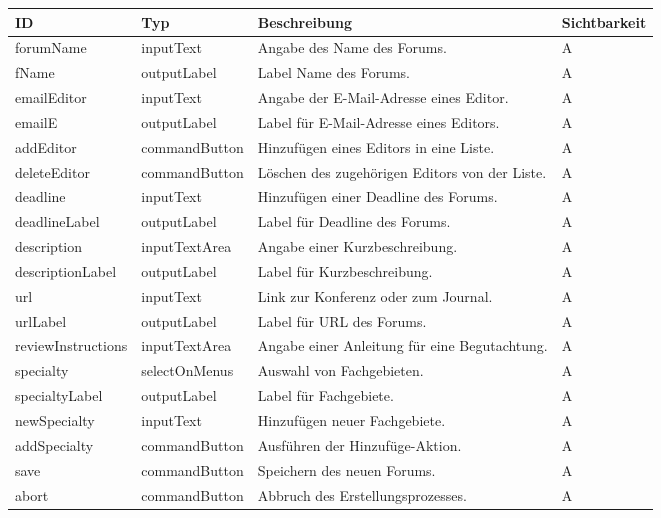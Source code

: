 \begin{tabular}[H]{|m{2cm}|m{3cm}|m{6cm}|m{2.5cm}|}
    \hline
    \textbf{ID} & \textbf{Typ} & \textbf{Beschreibung} & \textbf{Sichtbarkeit} \\
    \hline
    \hline
    forumName & inputText & Angabe des Name des Forums. & A\\
    \hline
    fName & outputLabel & Label Name des Forums. & A\\
    \hline
    emailEditor & inputText & Angabe der E-Mail-Adresse eines Editor. & A\\
    \hline
    emailE & outputLabel & Label für E-Mail-Adresse eines Editors. & A\\
    \hline
    addEditor & commandButton & Hinzufügen eines Editors in eine Liste. & A\\
    \hline
    deleteEditor & commandButton & Löschen des zugehörigen Editors von der Liste. & A\\
    \hline
    deadline & inputText & Hinzufügen einer Deadline des Forums. & A\\
    \hline
    deadlineLabel & outputLabel & Label für Deadline des Forums. & A\\
    \hline
    description & inputTextArea & Angabe einer Kurzbeschreibung. & A\\
    \hline
    descriptionLabel & outputLabel & Label für Kurzbeschreibung. & A\\
    \hline
    url & inputText & Link zur Konferenz oder zum Journal. & A\\
    \hline
    urlLabel & outputLabel & Label für URL des Forums. & A\\
    \hline
    reviewInstructions  & inputTextArea & Angabe einer Anleitung für eine Begutachtung. & A\\
    \hline
    specialty & selectOnMenus & Auswahl von Fachgebieten. & A\\
    \hline
    specialtyLabel & outputLabel & Label für Fachgebiete. & A\\
    \hline
    newSpecialty & inputText & Hinzufügen neuer Fachgebiete. & A\\
    \hline
    addSpecialty & commandButton & Ausführen der Hinzufüge-Aktion. & A\\
    \hline
    save & commandButton & Speichern des neuen Forums. & A\\
    \hline
    abort & commandButton & Abbruch des Erstellungsprozesses. & A\\
    \hline
\end{tabular}

